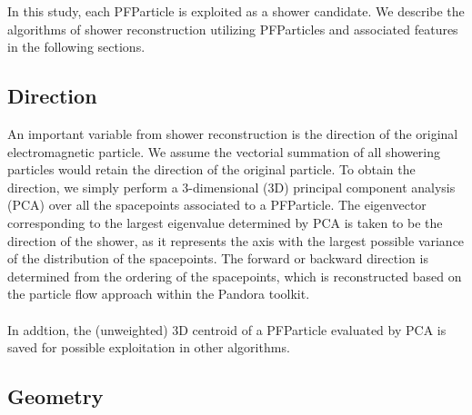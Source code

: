 In this study, each PFParticle is exploited as a shower candidate.
We describe the algorithms of shower reconstruction 
utilizing PFParticles and associated features in the following sections.

\subsection{Direction}
\label{sec:shr_direction}

An important variable from shower reconstruction is the direction of the 
original electromagnetic particle.
We assume the vectorial summation of all showering particles 
would retain the direction of the original particle.
To obtain the direction,
we simply perform a 3-dimensional (3D) principal component 
analysis (PCA) over all the spacepoints associated to a PFParticle.
The eigenvector corresponding to the largest eigenvalue determined by
PCA is taken to be the direction of the shower, as it represents the axis
with the largest possible variance of the distribution of the spacepoints.
The forward or backward direction is determined from the ordering of
the spacepoints, which is reconstructed based on the particle flow approach
within the Pandora toolkit.\\
\\
In addtion, the (unweighted) 3D centroid of a PFParticle evaluated
by PCA is saved for possible exploitation in other algorithms.

\subsection{Geometry}
\label{sec:shr_geometry}


